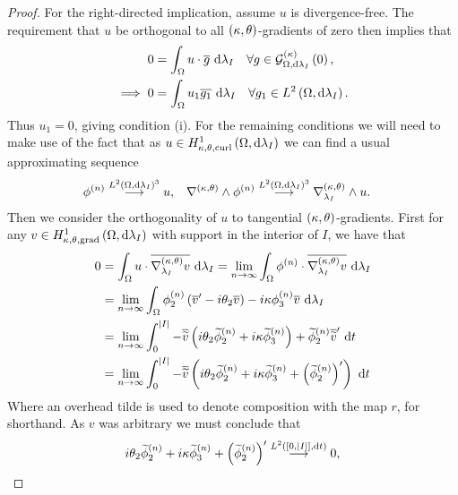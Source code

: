 \begin{proof}
	For the right-directed implication, assume $u$ is divergence-free.
	The requirement that $u$ be orthogonal to all $\left( \kappa, \theta \right)$-gradients of zero then implies that
	\begin{align*}
		 0 &= \int_{\Omega} u\cdot\overline{g}  \ \mathrm{d}\lambda_I \quad \forall g\in\mathcal{G}_{ \Omega, \mathrm{d}\lambda_I}^{(\kappa)}\left( 0 \right), \\
		 \implies 0 &= \int_{\Omega} u_1\overline{g_1}  \ \mathrm{d}\lambda_I \quad \forall g_1\in L^{2}\left( \Omega,\mathrm{d}\lambda_I \right).
	\end{align*}
	Thus $u_1 = 0$, giving condition (i).
	For the remaining conditions we will need to make use of the fact that as $u\in H^1_{\kappa,\theta,\mathrm{curl}}\left( \Omega, \mathrm{d}\lambda_I \right)$ we can find a usual approximating sequence
	\begin{align*}
		\phi^{(n)} \overset{L^{2}\left( \Omega,\mathrm{d}\lambda_I \right)^3}{\longrightarrow} u, 
		&\quad \nabla_{}^{\left( \kappa, \theta \right)}\wedge\phi^{(n)} \overset{L^{2}\left( \Omega,\mathrm{d}\lambda_I \right)^3}{\longrightarrow} \nabla_{\lambda_I}^{\left( \kappa, \theta \right)}\wedge u.
	\end{align*}
	Then we consider the orthogonality of $u$ to tangential $\left( \kappa, \theta \right)$-gradients.
	First for any $v\in H^1_{\kappa,\theta,\mathrm{grad}}\left( \Omega, \mathrm{d}\lambda_I \right)$ with support in the interior of $I$, we have that
	\begin{align*}
		0 &= \int_{\Omega} u\cdot\overline{\nabla^{\left( \kappa, \theta \right)}_{\lambda_I}v}  \ \mathrm{d}\lambda_I
		= \lim_{n\rightarrow\infty}\int_{\Omega} \phi^{(n)}\cdot\overline{\nabla^{\left( \kappa, \theta \right)}_{\lambda_I}v}  \ \mathrm{d}\lambda_I \\
		&= \lim_{n\rightarrow\infty}\int_{\Omega} \phi_2^{(n)}\left( \overline{v}' - i\theta_2\overline{v} \right) - i\kappa\phi_3^{(n)}\overline{v}  \ \mathrm{d}\lambda_I \\
		&= \lim_{n\rightarrow\infty}\int_0^{\left\lvert I \right\rvert} -\overline{\widetilde{v}}\left( i\theta_2\widetilde{\phi}_2^{(n)} + i\kappa\widetilde{\phi}_3^{(n)} \right) + \widetilde{\phi}_2^{(n)}\overline{\widetilde{v}}' \ \mathrm{d} t \\
		&= \lim_{n\rightarrow\infty}\int_0^{\left\lvert I \right\rvert} -\overline{\widetilde{v}}\left( i\theta_2\widetilde{\phi}_2^{(n)} + i\kappa\widetilde{\phi}_3^{(n)} + \left( \widetilde{\phi}_2^{(n)} \right)' \right) \ \mathrm{d} t \\
	\end{align*}
	Where an overhead tilde is used to denote composition with the map $r$, for shorthand.
	As $v$ was arbitrary we must conclude that 
	\begin{align*}
		i\qm_2\widetilde{\phi}_2^{(n)} + i\wavenumber\widetilde{\phi}_3^{(n)} + \bracs{\widetilde{\phi}_2^{(n)}}' \lconv{\ltwo{\interval{I}}{t}} 0,

\end{align*}
\end{proof}

